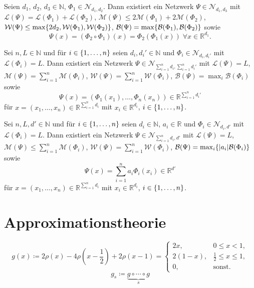 \documentclass[11pt]{scrartcl}
\newcommand{\N}{\mathbb{N}} %
\newcommand{\R}{\mathbb{R}} %
\begin{document}
\begin{lemma}
	Seien \(d_1\), \(d_2\), \(d_3 \in \N\), \(\Phi_1 \in \mathcal{N}_{d_1, d_2}\). Dann existiert ein 
	Netzwerk \(\Psi \in \mathcal{N}_{d_1, d_3}\) mit \(\mathcal{L}(\Psi) = \mathcal{L}(\Phi_1) + \mathcal{L}(\Phi_2)\), 
	\(\mathcal{M}(\Psi) \leq 2 \mathcal{M}(\Phi_1) + 2\mathcal{M}(\Phi_2)\), \(\mathcal{W}(\Psi) \leq 
	\max\{2d_2, \mathcal{W}(\Phi_1), \mathcal{W}(\Phi_2)\}\), \(\mathcal{B}(\Psi) = \max\{\mathcal{B}(\Phi_1), \mathcal{B}(\Phi_2)\}\) 
	sowie
	\[ \Psi(x) = (\Phi_2 \circ \Phi_1)(x) = \Phi_2(\Phi_1(x)) \;\forall x\in \R^{d_1}. \]
\end{lemma}

\begin{lemma}
	Sei \(n, L \in\N\) und für \(i\in \{1,\ldots, n\}\) seien \(d_i, d_i' \in \N\) und \(\Phi_i \in \mathcal{N}_{d_i, d_i'}\) 
	mit \(\mathcal{L}(\Phi_i) = L\). Dann existiert ein Netzwerk \(\Psi \in \mathcal{N}_{\sum_{i=1}^n d_i, \sum_{i=1}^n d_i'}\) 
	mit \(\mathcal{L}(\Psi) = L\), \(\mathcal{M}(\Psi) = \sum_{i=1}^n \mathcal{M}(\Phi_i)\), 
	\(\mathcal{W}(\Psi) = \sum_{i=1}^n \mathcal{W}(\Phi_i)\), \(\mathcal{B}(\Psi) = \max_i \mathcal{B}(\Phi_i)\) sowie 
	\[ \Psi(x) = (\Phi_1(x_1), \ldots, \Phi_n(x_n)) \in \R^{\sum_{i=1}^n d_i'} \]
	für \(x = (x_1, \ldots, x_n) \in \R^{\sum_{i=1}^n d_i}\) mit \(x_i \in \R^{d_i}\), \(i\in \{1,\ldots, n\}\).
\end{lemma}

\begin{lemma}
	Sei \(n, L, d' \in\N\) und für \(i\in \{1,\ldots, n\}\) seien \(d_i \in \N\), \(a_i \in \R\) und \(\Phi_i \in \mathcal{N}_{d_i, d'}\) 
	mit \(\mathcal{L}(\Phi_i) = L\). Dann existiert ein Netzwerk \(\Psi \in \mathcal{N}_{\sum_{i=1}^n d_i, d'}\) 
	mit \(\mathcal{L}(\Psi) = L\), \(\mathcal{M}(\Psi) \leq \sum_{i=1}^n \mathcal{M}(\Phi_i)\), 
	\(\mathcal{W}(\Psi) = \sum_{i=1}^n \mathcal{W}(\Phi_i)\), \(\mathcal{B}(\Psi) = \max_i \{|a_i| \mathcal{B}(\Phi_i)\}\) sowie 
	\[ \Psi(x) = \sum_{i=1}^n a_i \Phi_i(x_i) \in \R^{d'} \]
	für \(x = (x_1, \ldots, x_n) \in \R^{\sum_{i=1}^n d_i}\) mit \(x_i \in \R^{d_i}\), \(i\in \{1,\ldots, n\}\).
\end{lemma}

\section{Approximationstheorie}

\begin{definition}
	\[g(x) \coloneqq 2\rho(x) - 4 \rho(x - \frac{1}{2}) + 2\rho(x-1) = \begin{cases}
        2x, & 0\leq x < 1, \\ 
        2(1-x), & \frac{1}{2} \leq x \leq 1, \\
        0, & \text{sonst.}
    \end{cases}\]
    \[g_s \coloneqq \underbrace{g \circ \cdots \circ g}_s \]
\end{definition}
\end{document}
